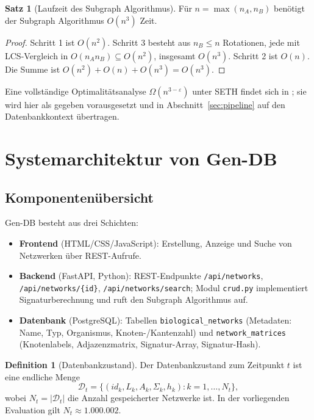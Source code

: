 \documentclass[a4paper,12pt]{article}
\theoremstyle{definition}
\newtheorem{definition}{Definition}
\newtheorem{satz}{Satz}
\begin{document}
\begin{satz}[Laufzeit des Subgraph Algorithmus]
	\label{satz:laufzeit}
	Für $n = \max(n_A, n_B)$ benötigt der Subgraph Algorithmus $O(n^3)$ Zeit.
\end{satz}

\begin{proof}
	Schritt 1 ist $O(n^2)$. Schritt 3 besteht aus $n_B \le n$ Rotationen, jede mit LCS-Vergleich in $O(n_A n_B) \subseteq O(n^2)$, insgesamt $O(n^3)$. Schritt 2 ist $O(n)$. Die Summe ist $O(n^2) + O(n) + O(n^3) = O(n^3)$.
\end{proof}

Eine vollständige Optimalitätsanalyse $\Omega(n^{3-\varepsilon})$ unter SETH findet sich in \cite{epp2026subgraph}; sie wird hier als gegeben vorausgesetzt und in Abschnitt~\ref{sec:pipeline} auf den Datenbankkontext übertragen.

\section{Systemarchitektur von Gen-DB}
\label{sec:architektur}

\subsection{Komponentenübersicht}

Gen-DB besteht aus drei Schichten:

\begin{itemize}
	\item \textbf{Frontend} (HTML/CSS/JavaScript): Erstellung, Anzeige und Suche von Netzwerken über REST-Aufrufe.
	\item \textbf{Backend} (FastAPI, Python): REST-Endpunkte \texttt{/api/networks}, \texttt{/api/networks/\{id\}}, \texttt{/api/networks/search}; Modul \texttt{crud.py} implementiert Signaturberechnung und ruft den Subgraph Algorithmus auf.
	\item \textbf{Datenbank} (PostgreSQL): Tabellen \texttt{biological\_networks} (Metadaten: Name, Typ, Organismus, Knoten-/Kantenzahl) und \texttt{network\_matrices} (Knotenlabels, Adjazenzmatrix, Signatur-Array, Signatur-Hash).
\end{itemize}

\begin{definition}[Datenbankzustand]
	Der Datenbankzustand zum Zeitpunkt $t$ ist eine endliche Menge
	\[
	\mathcal{D}_t = \{(id_k, L_k, A_k, \Sigma_k, h_k) : k = 1,\ldots,N_t\},
	\]
	wobei $N_t = |\mathcal{D}_t|$ die Anzahl gespeicherter Netzwerke ist. In der vorliegenden Evaluation gilt $N_t \approx 1.000.002$.
\end{definition}
\end{document}
